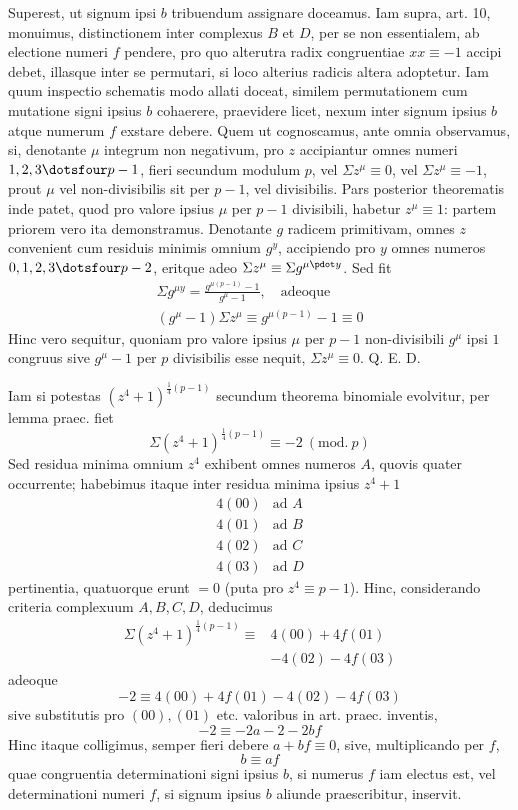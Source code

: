 Superest, ut signum ipsi $b$ tribuendum assignare doceamus. Iam supra, art. 10, monuimus, distinctionem inter complexus $B$ et $D$, per se non essentialem, ab electione numeri $f$ pendere, pro quo alterutra radix congruentiae $xx\equiv-1$ accipi debet, illasque inter se permutari, si loco alterius radicis altera adoptetur. Iam quum inspectio schematis modo allati doceat, similem permutationem cum mutatione signi ipsius $b$ cohaerere, praevidere licet, nexum inter signum ipsius $b$ atque numerum $f$ exstare debere. Quem ut cognoscamus, ante omnia observamus, si, denotante $\mu$ integrum non negativum, pro $z$ accipiantur omnes numeri $1,2,3\dotsfour p-1$, fieri secundum modulum $p$, vel $\Sigma z^\mu\equiv0$, vel $\Sigma z^\mu\equiv-1$, prout $\mu$ vel non-divisibilis sit per $p-1$, vel divisibilis. Pars posterior theorematis inde patet, quod pro valore ipsius $\mu$ per $p-1$ divisibili, habetur $z^\mu\equiv1$: partem priorem vero ita demonstramus. Denotante $g$ radicem primitivam, omnes $z$ convenient cum residuis minimis omnium $g^y$, accipiendo pro $y$ omnes numeros $0,1,2,3\dotsfour p-2$, eritque adeo $\Sigma z^\mu\equiv\Sigma g^{\mu\pdot y}$. Sed fit
\[
\begin{gathered}
\Sigma g^{\mu y}=\frac{g^{\mu(p-1)}-1}{g^\mu-1},\quad\text{adeoque}\\
(g^\mu-1)\Sigma z^\mu\equiv g^{\mu(p-1)}-1\equiv0
\end{gathered}
\]
Hinc vero sequitur, quoniam pro valore ipsius $\mu$ per $p-1$ non-divisibili $g^\mu$ ipsi $1$ congruus sive $g^\mu-1$ per $p$ divisibilis esse nequit, $\Sigma z^\mu\equiv0$. Q. E. D.

%
Iam si potestas $(z^4+1)^{\frac14(p-1)}$ secundum theorema binomiale evolvitur, per lemma praec. fiet
\[
\Sigma(z^4+1)^{\frac14(p-1)}\equiv-2\ (\mathrm{mod.}\ p)
\]
Sed residua minima omnium $z^4$ exhibent omnes numeros $A$, quovis quater occurrente; habebimus itaque inter residua minima ipsius $z^4+1$
\[
\begin{array}{rl}
4(00)&\text{ad }A\\
4(01)&\text{ad }B\\
4(02)&\text{ad }C\\
4(03)&\text{ad }D
\end{array}
\]
pertinentia, quatuorque erunt $=0$ (puta pro $z^4\equiv p-1$). Hinc, considerando criteria complexuum $A,B,C,D$, deducimus
\[
\begin{aligned}
\Sigma(z^4+1)^{\frac14(p-1)}\equiv{}&4(00)+4f(01)\\
&-4(02)-4f(03)
\end{aligned}
\]
adeoque
\[
-2\equiv4(00)+4f(01)-4(02)-4f(03)
\]
sive substitutis pro $(00),(01)$ etc. valoribus in art. praec. inventis,
\[
-2\equiv-2a-2-2bf
\]
Hinc itaque colligimus, semper fieri debere $a+bf\equiv0$, sive, multiplicando per $f$,
\[
b\equiv af
\]
quae congruentia determinationi signi ipsius $b$, si numerus $f$ iam electus est, vel determinationi numeri $f$, si signum ipsius $b$ aliunde praescribitur, inservit.

